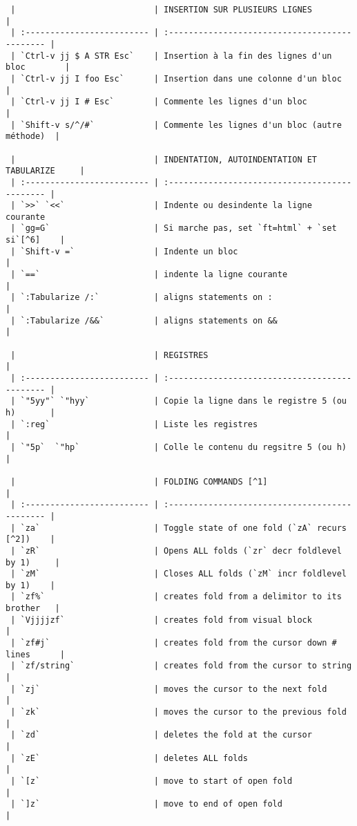 \documentclass[10pt,landscape]{article}
\begin{document}
\begin{multicols}{2}
\begin{verbatim}
 |                            | INSERTION SUR PLUSIEURS LIGNES                 |
 | :------------------------- | :--------------------------------------------- |
 | `Ctrl-v jj $ A STR Esc`    | Insertion à la fin des lignes d'un bloc        |
 | `Ctrl-v jj I foo Esc`      | Insertion dans une colonne d'un bloc           |
 | `Ctrl-v jj I # Esc`        | Commente les lignes d'un bloc                  |
 | `Shift-v s/^/#`            | Commente les lignes d'un bloc (autre méthode)  |

 |                            | INDENTATION, AUTOINDENTATION ET TABULARIZE     |
 | :------------------------- | :--------------------------------------------- |
 | `>>` `<<`                  | Indente ou desindente la ligne courante
 | `gg=G`                     | Si marche pas, set `ft=html` + `set si`[^6]    |
 | `Shift-v =`                | Indente un bloc                                |
 | `==`                       | indente la ligne courante                      |
 | `:Tabularize /:`           | aligns statements on :                         |
 | `:Tabularize /&&`          | aligns statements on &&                        |

 |                            | REGISTRES                                      |
 | :------------------------- | :--------------------------------------------- |
 | `"5yy"` `"hyy`             | Copie la ligne dans le registre 5 (ou h)       |
 | `:reg`                     | Liste les registres                            |
 | `"5p`  `"hp`               | Colle le contenu du regsitre 5 (ou h)          |

 |                            | FOLDING COMMANDS [^1]                          |
 | :------------------------- | :--------------------------------------------- |
 | `za`                       | Toggle state of one fold (`zA` recurs [^2])    |
 | `zR`                       | Opens ALL folds (`zr` decr foldlevel by 1)     |
 | `zM`                       | Closes ALL folds (`zM` incr foldlevel by 1)    |
 | `zf%`                      | creates fold from a delimitor to its brother   |
 | `Vjjjjzf`                  | creates fold from visual block                 |
 | `zf#j`                     | creates fold from the cursor down # lines      |
 | `zf/string`                | creates fold from the cursor to string         |
 | `zj`                       | moves the cursor to the next fold              |
 | `zk`                       | moves the cursor to the previous fold          |
 | `zd`                       | deletes the fold at the cursor                 |
 | `zE`                       | deletes ALL folds                              |
 | `[z`                       | move to start of open fold                     |
 | `]z`                       | move to end of open fold                       |


\end{verbatim}
\end{multicols}
\end{document}
